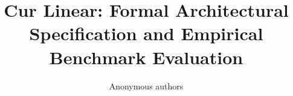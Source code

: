 \title{\textbf{Cur Linear: Formal Architectural Specification and Empirical Benchmark Evaluation}}

\author{Anonymous authors}
